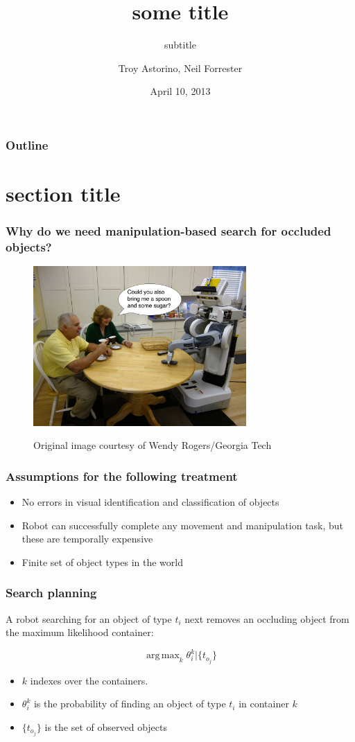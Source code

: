 \documentclass{beamer}
\title{some title}
\subtitle{subtitle}
\author{Troy Astorino, Neil Forrester}
\date{April 10, 2013}
\institute[6.834 -- MIT]{Cognitive Robotics \\ Massachusetts Institute of Technology}
\DeclareMathOperator*{\argmax}{arg\,max}
\begin{document}
\begin{frame}
  \maketitle
\end{frame}

\begin{frame}
  \frametitle{Outline}
  \tableofcontents
\end{frame}

\section{section title}
\begin{frame}
  \frametitle{Why do we need manipulation-based search for occluded
    objects?}
  \begin{figure}
    \centering
    \includegraphics[width=3.2in]{img/robot_in_kitchen.jpg}

    \tiny{Original image courtesy of Wendy Rogers/Georgia Tech}
  \end{figure}
\end{frame}

\begin{frame}
  \frametitle{Assumptions for the following treatment}
  \begin{itemize}
  \item No errors in  visual identification and classification of objects
  \item Robot can successfully complete any movement and manipulation task, but
    these are temporally expensive
  \item Finite set of object types in the world
  \end{itemize}
\end{frame}

\begin{frame}
  \frametitle{Search planning}
  A robot searching for an object of type $t_i$ next removes an occluding object
  from the maximum likelihood container:

  \[\argmax_k{\theta_i^k|\{t_{o_j}\}}\]
  
  \begin{itemize}
  \item $k$ indexes over the containers.
  \item $\theta_i^k$ is the probability of finding an object of type $t_i$ in
    container $k$
  \item $\{t_{o_j}\}$ is the set of observed objects
  \end{itemize}
\end{frame}
\end{document}
